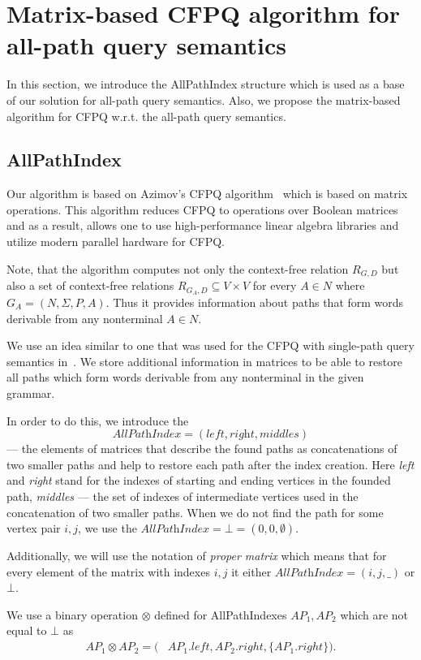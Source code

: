 \section{Matrix-based CFPQ algorithm for all-path query semantics}
\label{sec:all-path-algo}
In this section, we introduce the AllPathIndex structure which is used as a base of our solution for all-path query semantics. Also, we propose the matrix-based algorithm for CFPQ w.r.t. the all-path query semantics.

\subsection{AllPathIndex}
Our algorithm is based on Azimov's CFPQ algorithm~\cite{Azimov:2018:CPQ:3210259.3210264} which is based on matrix operations.
This algorithm reduces CFPQ to operations over Boolean matrices and as a result, allows one to use high-performance linear algebra libraries and utilize modern parallel hardware for CFPQ.

Note, that the algorithm computes not only the context-free relation $R_{G,D}$ but also a set of context-free relations $R_{G_A,D} \subseteq V \times V$ for every $A \in N$ where $G_A = (N, \Sigma, P, A)$.
Thus it provides information about paths that form words derivable from any nonterminal $A \in N$.

We use an idea similar to one that was used for the CFPQ with single-path query semantics in~\cite{10.1145/3398682.3399163}. We store additional information in matrices to be able to restore all paths which form words derivable from any nonterminal in the given grammar.

In order to do this, we introduce the 
$$\textit{AllPathIndex} = (\textit{left},\textit{right},\textit{middles})$$ 
--- the elements of matrices that describe the found paths as concatenations of two smaller paths and help to restore each path after the index creation. Here \textit{left} and \textit{right} stand for the indexes of starting and ending vertices in the founded path, \textit{middles} --- the set of indexes of intermediate vertices used in the concatenation of two smaller paths. When we do not find the path for some vertex pair $i,j$, we use the $\textit{AllPathIndex} = \bot = (0,0,\emptyset)$.

Additionally, we will use the notation of \textit{proper matrix} which means that for every element of the matrix with indexes $i,j$ it either $\textit{AllPathIndex} = (i,j,\_)$ or $\bot$.

We use a binary operation $\otimes$ defined for AllPathIndexes \mbox{$AP_1, AP_2$} which are not equal to $\bot$ as
\begin{align*}
	AP_1 \otimes AP_2 = (&AP_1.left, AP_2.right, \{AP_1.right\}).
\end{align*}

